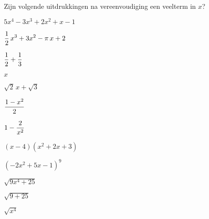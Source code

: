 \documentclass{ximera}
\begin{document}
\begin{exercise}
	\begin{statement} Zijn volgende uitdrukkingen na vereenvoudiging een veelterm in $x$? \end{statement}
	
\begin{xmmulticols}
	\begin{question} \choiceYes \( 5x^4-3x^3+2x^2+x-1                    \)   \end{question}
	\begin{question} \choiceYes \( \displaystyle \frac{1}{2}\,x^3 + 3x^2-\pi\,x+2   \)   \end{question}
	\begin{question} \choiceYes \( \displaystyle \frac{1}{2}+\frac{1}{3}            \)   \end{question}
	\begin{question} \choiceYes \( x                                     \)   \end{question}
	\begin{question} \choiceYes \( \sqrt{2}\,x + \sqrt{3}                \)   \end{question}
	\begin{question} \choiceYes \( \displaystyle \frac{1-x^2}{2}                    \)   \end{question}
	\begin{question} \choiceNo  \( \displaystyle 1-\frac{2}{x^2}                    \)   \end{question}
	\begin{question} \choiceYes \( (x-4)(x^2+2x+3)                       \)   \end{question}
	\begin{question} \choiceYes \( (-2x^2+5x-1)^{9}                      \)   \end{question}
	\begin{question} \choiceNo  \( \sqrt{9x^4+25}                        \)   \end{question}
	\begin{question} \choiceYes \( \sqrt{9+25}                           \)   \end{question}
	\begin{question} \choiceYes \( \sqrt{x^4}                            \)   \end{question}
\end{xmmulticols}
\end{exercise}
\end{document}
